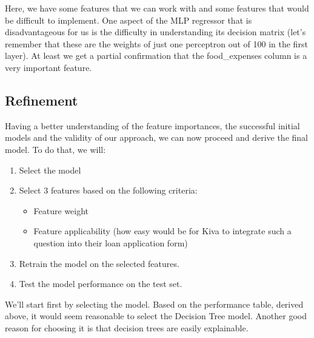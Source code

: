 \documentclass{article}
\begin{document}
Here, we have some features that we can work with and some features that would be difficult to implement. One aspect of the MLP regressor that is disadvantageous for us is the difficulty in understanding its decision matrix (let's remember that these are the weights of just one perceptron out of 100 in the first layer). At least we get a partial confirmation that the food\_expenses column is a very important feature.

\subsection{Refinement}
Having a better understanding of the feature importances, the successful initial models and the validity of our approach, we can now proceed and derive the final model. To do that, we will:

\begin{enumerate}
  \item Select the model
  \item Select 3 features based on the following criteria:
  \begin{itemize}
    \item Feature weight
    \item Feature applicability (how easy would be for Kiva to integrate such a question into their loan application form)
  \end{itemize}
  \item Retrain the model on the selected features.
  \item Test the model performance on the test set.
\end{enumerate}

We'll start first by selecting the model. Based on the performance table, derived above, it would seem reasonable to select the Decision Tree model. Another good reason for choosing it is that decision trees are easily explainable.
\end{document}
